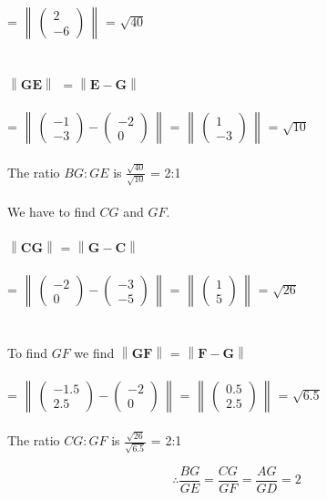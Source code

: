 \documentclass[journal,12pt,twocolumn]{IEEEtran}
\theoremstyle{remark}
\newcommand{\norm}[1]{\left\lVert#1\right\rVert}
\newcommand{\myvec}[1]{\begin{pmatrix}#1\end{pmatrix}}
\let\vec\mathbf
\begin{document}
= $\norm{\,\myvec{2 \\ -6}\,}$ = $\sqrt{40}$\\\\
\\$\norm{\vec{GE}}$
$ = \norm{\vec{E} -\vec{G}}$ \\\\ = $\norm{\,\myvec{-1 \\ -3}-\myvec{-2 \\ 0}\,}$ = $\norm{\,\myvec{1 \\ -3}\,}$ = $\sqrt{10}$\\\\
The ratio $BG:GE$ is $\frac{\sqrt{40}}{\sqrt{10}}$ = 2:1\\\\
We have to find $CG$ and $GF$.\\\\
$\norm{\vec{CG}}$ = $\norm{\vec{G} -\vec{C}}$ \\\\= $\norm{\,\myvec{-2 \\ 0}-\myvec{-3 \\ -5}\,}$ = $\norm{\,\myvec{1 \\ 5}\,}$ = $\sqrt{26}$\\\\
\\To find $GF$ we find $\norm{\vec{GF}}$ = $\norm{\vec{F} -\vec{G}}$ \\\\= $\norm{\,\myvec{-1.5 \\  2.5}-\myvec{-2 \\ 0}\,}$ = $\norm{\,\myvec{0.5 \\ 2.5}\,}$ = $\sqrt{6.5}$\\\\
The ratio $CG:GF$ is $\frac{\sqrt{26}}{\sqrt{6.5}}$ = 2:1

$$\therefore \frac{BG}{GE}=\frac{CG}{GF}=\frac{AG}{GD}=2$$


%
{}
\end{document}

